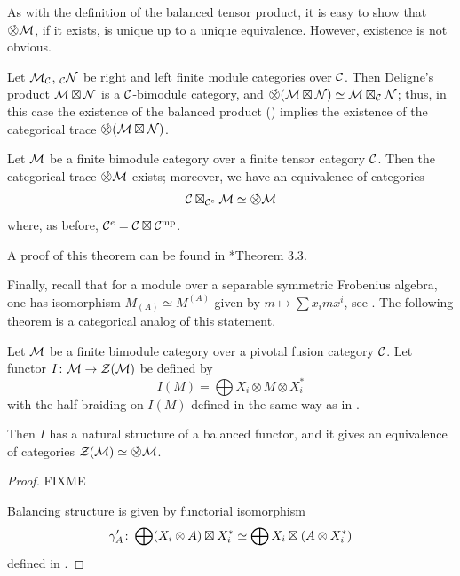 As with the definition of the balanced tensor product, it is easy to show that
$\circtensor \calM$, if it exists, is unique up to a unique equivalence. However,
existence is not obvious.

\begin{example}\label{x:trace-deligne-product}
  Let $\mathcal{M}_{\mathcal{C}}$, ${}_{\mathcal{C}} \mathcal{N}$ be right and left finite module
  categories over $\mathcal{C}$. Then Deligne's product $\mathcal{M}\boxtimes \mathcal{N}$ is
  a $\mathcal{C}$-bimodule category, and $\circtensor (\calM\boxtimes \calN)\simeq
  \calM\boxtimes_\calC\calN$; thus, in this case the existence of the balanced product
  () implies the existence of the categorical trace
  $\circtensor (\calM\boxtimes\calN)$.
\end{example}
\begin{theorem}\label{t:cat-trace}
  Let $\mathcal{M}$ be a finite bimodule category over a finite tensor category
  $\mathcal{C}$. Then the categorical trace $\circtensor \calM$ exists;
  moreover, we have an equivalence of categories
  $$
    \calC\boxtimes_{\calC^e} \calM \simeq \circtensor \calM
  $$
  where, as before, $\mathcal{C}^e=\mathcal{C}\boxtimes\mathcal{C}^{\mathrm{mp}}$.
\end{theorem}
  A proof of this theorem can be found in
  *{Theorem 3.3}.


Finally, recall that for a module over a separable symmetric Frobenius algebra,
one has isomorphism $M_{(A)}\simeq M^{(A)}$ given by $m\mapsto \sum x_imx^i$,
see . The following theorem is a categorical analog of
this statement.

\begin{theorem}\label{t:category-inv-coinv}
  Let $\mathcal{M}$ be a finite bimodule category over a pivotal fusion
  category  $\mathcal{C}$. Let functor $I\colon \mathcal{M}\to \mathcal{Z}(\mathcal{M})$ be defined by
  \begin{equation}
    I(M)= \bigoplus X_i\otimes M\otimes X_i^*
  \end{equation}
  with the half-braiding on $I(M)$ defined in the same way as in
  .

  Then $I$ has a natural structure of a balanced functor, and it
  gives an equivalence of categories $\calZ(\calM)\simeq \circtensor \calM$.
\end{theorem}
\begin{proof}
    FIXME

    Balancing structure is given by functorial isomorphism
    $$
    \gamma'_A\colon \bigoplus (X_i\otimes A) \boxtimes X_i^* \simeq
              \bigoplus X_i \boxtimes (A\otimes X_i^*)
    $$
    defined in .
\end{proof}